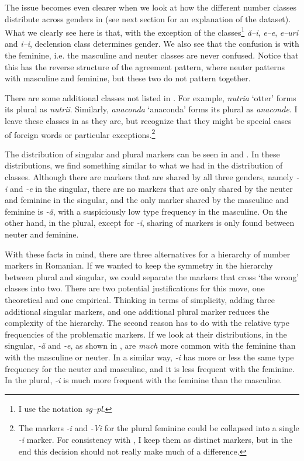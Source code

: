 The issue becomes even clearer when we look at how the different number classes distribute across genders in  (see next section for an explanation of the dataset). What we clearly see here is that, with the exception of the classes\footnote{I use the notation \textit{sg--pl}.} \textit{ă--i}, \textit{e--e}, \textit{e--uri} and \textit{i--i}, declension class determines gender. We also see that the confusion is with the feminine, i.e. the masculine and neuter classes are never confused. Notice that this has the reverse structure of the agreement pattern, where neuter patterns with masculine and feminine, but these two do not pattern together.

\largerpage[2]
There are some additional classes not listed in \textcite{Cojocaru.2003}. For example, \textit{nutria} `otter' forms its plural as \textit{nutrii}. Similarly, \textit{anaconda} `anaconda' forms its plural as \textit{anaconde}. I leave these classes in as they are, but recognize that they might be special cases of foreign words or particular exceptions.\footnote{The markers \textit{-i} and \textit{-Vi} for the plural feminine could be collapsed into a single \textit{-i} marker. For consistency with \textcite{Cojocaru.2003}, I keep them as distinct markers, but in the end this decision should not really make much of a difference.}

The distribution of singular and plural markers can be seen in  and . In these distributions, we find something similar to what we had in the distribution of classes. Although there are markers that are shared by all three genders, namely \textit{-i} and \textit{-e} in the singular, there are no markers that are only shared by the neuter and feminine in the singular, and the only marker shared by the masculine and feminine is \textit{-ă}, with a suspiciously low type frequency in the masculine. On the other hand, in the plural, except for \textit{-i}, sharing of markers is only found between neuter and feminine.

With these facts in mind, there are three alternatives for a hierarchy of number markers in Romanian. If we wanted to keep the symmetry in the hierarchy between plural and singular, we could separate the markers that cross `the wrong' classes into two. There are two potential justifications for this move, one theoretical and one empirical. Thinking in terms of simplicity, adding three additional singular markers, and one additional plural marker reduces the complexity of the hierarchy. The second reason has to do with the relative type frequencies of the problematic markers. If we look at their distributions, in the singular, \textit{-ă} and \textit{-e}, as shown in , are \textit{much} more common with the feminine than with the masculine or neuter. In a similar way, \textit{-i} has more or less the same type frequency for the neuter and masculine, and it is less frequent with the feminine. In the plural, \textit{-i} is much more frequent with the feminine than the masculine.

